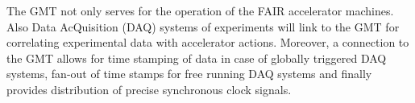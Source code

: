 The  GMT not only  serves for  the operation  of the  FAIR accelerator
machines. Also Data AcQuisition (DAQ) systems of experiments will link
to  the  GMT  for   correlating  experimental  data  with  accelerator
actions. Moreover, a connection to the GMT allows for time stamping of
data in case of globally triggered DAQ systems, fan-out of time stamps
for  free running  DAQ systems  and finally  provides  distribution of
precise synchronous clock signals.
